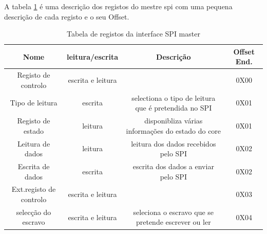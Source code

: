 A tabela \ref{table:registos_SPI_master} é uma descrição dos registos do mestre \acrshort{spi} com uma pequena descrição de cada registo e o seu Offset. 

\begin{table}[h!]
  \begin{center}
    \begin{tabular}{|c|c|c|c|}
      \hline
      Nome & leitura/escrita & Descrição & Offset End. \\
      \hline \hline
      Registo de controlo & escrita e leitura &  & 0X00 \\
      \hline
      Tipo de leitura & escrita  & selectiona o tipo de leitura que é pretendida no SPI & 0X01 \\
      \hline
      Registo de estado & leitura & disponibliza várias informações do estado do core & 0X01 \\
      \hline
      Leitura de dados & leitura & leitura dos dados recebidos pelo SPI & 0X02 \\
      \hline
      Escrita de dados & escrita & escrita dos dados a enviar pelo SPI & 0X02 \\
      \hline
      Ext.registo de controlo & escrita e leitura & & 0X03 \\
      \hline
      selecção do escravo & escrita e leitura & seleciona o escravo que se pretende escrever ou ler & 0X04 \\
      \hline
    \end{tabular}
  \end{center}
  \caption[Tabela de registo do core SPI master]{Tabela de registos da interface SPI master}
  \label{table:registos_SPI_master}
\end{table}

